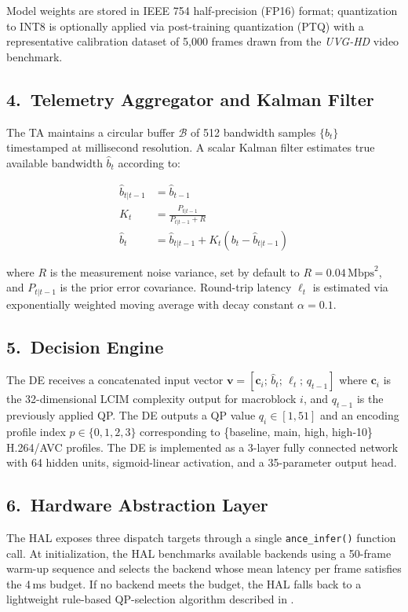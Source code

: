 Model weights are stored in IEEE 754 half-precision (FP16) format; quantization to
INT8 is optionally applied via post-training quantization (PTQ) with a representative
calibration dataset of 5,000 frames drawn from the \textit{UVG-HD} video benchmark.

\subsection{4.~Telemetry Aggregator and Kalman Filter}

The TA maintains a circular buffer $\mathcal{B}$ of 512 bandwidth samples
$\{b_t\}$ timestamped at millisecond resolution. A scalar Kalman filter
estimates true available bandwidth $\hat{b}_t$ according to:

\begin{align}
  \hat{b}_{t|t-1} &= \hat{b}_{t-1} \\[2pt]
  K_t             &= \frac{P_{t|t-1}}{P_{t|t-1} + R} \\[2pt]
  \hat{b}_t       &= \hat{b}_{t|t-1} + K_t\!\left(b_t - \hat{b}_{t|t-1}\right)
\end{align}

where $R$ is the measurement noise variance, set by default to
$R = 0.04\,\text{Mbps}^2$, and $P_{t|t-1}$ is the prior error covariance.
Round-trip latency $\ell_t$ is estimated via exponentially weighted moving average
with decay constant $\alpha = 0.1$.

\subsection{5.~Decision Engine}

The DE receives a concatenated input vector
$\mathbf{v} = [\mathbf{c}_i;\, \hat{b}_t;\, \ell_t;\, q_{t-1}]$
where $\mathbf{c}_i$ is the 32-dimensional LCIM complexity output for macroblock $i$,
and $q_{t-1}$ is the previously applied QP. The DE outputs a QP value
$q_i \in [1, 51]$ and an encoding profile index $p \in \{0, 1, 2, 3\}$
corresponding to \{baseline, main, high, high-10\} H.264/AVC profiles.
The DE is implemented as a 3-layer fully connected network with 64 hidden units,
sigmoid-linear activation, and a 35-parameter output head.

\subsection{6.~Hardware Abstraction Layer}

The HAL exposes three dispatch targets through a single \texttt{ance\_infer()}
function call. At initialization, the HAL benchmarks available backends using
a 50-frame warm-up sequence and selects the backend whose mean latency per frame
satisfies the 4\,ms budget. If no backend meets the budget, the HAL falls back to
a lightweight rule-based QP-selection algorithm described in .

